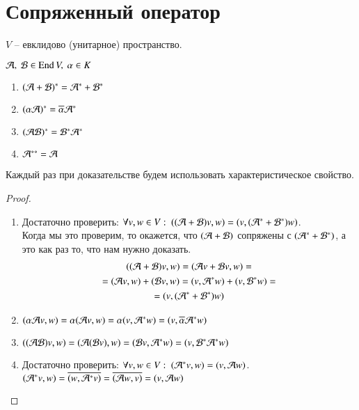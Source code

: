 \documentclass[main]{subfiles}
\begin{document}
\chapter{Сопряженный оператор}


$V$ -- евклидово (унитарное) пространство.

\begin{proposition}
    $\mathcal{A}, \ \mathcal{B} \in \operatorname{End} V, \ \alpha \in K$
    \begin{enumerate}
        \item $(\mathcal{A} + \mathcal{B})^* = \mathcal{A}^* + \mathcal{B}^*$
        \item $(\alpha \mathcal{A})^* = \overline{\alpha} \mathcal{A}^*$
        \item $(\mathcal{A} \mathcal{B})^* = \mathcal{B}^* \mathcal{A}^*$
        \item $\mathcal{A}^{**} = \mathcal{A}$
    \end{enumerate}
\end{proposition}

Каждый раз при доказательстве будем использовать характеристическое свойство.

\begin{proof}
    \begin{enumerate}
        \item Достаточно проверить: $\forall v, w \in V: \ ((\mathcal{A} + \mathcal{B})v, w) = (v, (\mathcal{A}^* + \mathcal{B}^*) w)$. \\
              Когда мы это проверим, то окажется, что $(\mathcal{A} + \mathcal{B})$ сопряжены с $(\mathcal{A}^* + \mathcal{B}^*)$, а это как раз то, что нам нужно доказать.
              \begin{multline*}
                  ((\mathcal{A} + \mathcal{B})v, w) = (\mathcal{A} v + \mathcal{B} v, w) = \\
                  = (\mathcal{A} v, w) + (\mathcal{B} v, w) = (v, \mathcal{A}^* w) + (v, \mathcal{B}^* w) = \\
                  = (v, (\mathcal{A}^* + \mathcal{B}^*) w)
              \end{multline*}
        \item

              $(\alpha \mathcal{A} v, w) = \alpha(\mathcal{A} v, w) = \alpha(v, \mathcal{A}^* w) = (v, \overline{\alpha} \mathcal{A}^* w)$

        \item  $((\mathcal{A} \mathcal{B})v, w)= (\mathcal{A}(\mathcal{B} v), w) = (\mathcal{B} v, \mathcal{A}^* w) = (v, \mathcal{B}^* \mathcal{A}^* w) $
        \item Достаточно проверить: $\forall v, w \in V: \ (\mathcal{A}^* v, w) = (v,\mathcal{A} w)$. \\
              $(\mathcal{A}^* v, w) = \overline{(w, \mathcal{A}^* v)} = \overline{(\mathcal{A} w, v)} = (v, \mathcal{A} w) $
    \end{enumerate}
\end{proof}
\end{document}
